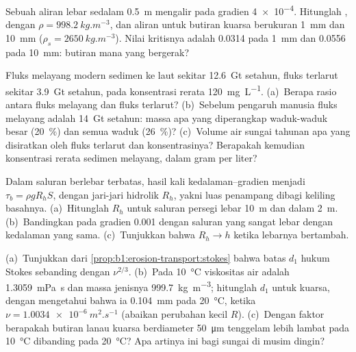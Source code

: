 \begin{exercise}[$\star$]\label{exo:b1:erosion-transport:3}
Sebuah aliran lebar sedalam \qty{0.5}{m} mengalir pada gradien \num{4e-4}. Hitunglah , dengan $\rho = \qty{998.2}{kg.m^{-3}}$, dan  aliran untuk butiran kuarsa berukuran \qty{1}{mm} dan \qty{10}{mm} ($\rho_s = \qty{2650}{kg.m^{-3}}$). Nilai kritisnya adalah \num{0.0314} pada \qty{1}{mm} dan \num{0.0556} pada \qty{10}{mm}: butiran mana yang bergerak?
\end{exercise}

\begin{exercise}[$\star$]\label{exo:b1:erosion-transport:4}
Fluks melayang modern sedimen ke laut sekitar \qty{12.6}{Gt} setahun, fluks terlarut sekitar \qty{3.9}{Gt} setahun, pada konsentrasi rerata \qty{120}{mg.L^{-1}}. (a)~Berapa rasio antara fluks melayang dan fluks terlarut? (b)~Sebelum pengaruh manusia fluks melayang adalah \qty{14}{Gt} setahun: massa apa yang diperangkap waduk-waduk besar (\qty{20}{\percent}) dan semua waduk (\qty{26}{\percent})? (c)~Volume air sungai tahunan apa yang disiratkan oleh fluks terlarut dan konsentrasinya? Berapakah kemudian konsentrasi rerata sedimen melayang, dalam gram per liter?
\end{exercise}

\begin{exercise}[$\star\star$]\label{exo:b1:erosion-transport:5}
Dalam saluran berlebar terbatas, hasil kali kedalaman--gradien menjadi $\tau_b =
\rho g R_h S$, dengan jari-jari hidrolik $R_h$, yakni luas penampang dibagi keliling basahnya. (a)~Hitunglah $R_h$ untuk saluran persegi lebar \qty{10}{m} dan dalam \qty{2}{m}. (b)~Bandingkan  pada gradien \num{0.001} dengan  saluran yang sangat lebar dengan kedalaman yang sama. (c)~Tunjukkan bahwa $R_h \to h$ ketika lebarnya bertambah.
\end{exercise}

\begin{exercise}[$\star\star$]\label{exo:b1:erosion-transport:6}
(a)~Tunjukkan dari \cref{prop:b1:erosion-transport:stokes} bahwa batas $d_1$ hukum Stokes
sebanding dengan $\nu^{2/3}$. (b)~Pada \qty{10}{\celsius} viskositas air adalah \qty{1.3059}{mPa.s} dan massa jenisnya
\qty{999.7}{kg.m^{-3}}; hitunglah $d_1$ untuk kuarsa, dengan mengetahui bahwa ia
\qty{0.104}{mm} pada \qty{20}{\celsius}, ketika $\nu = \qty{1.0034e-6}{m^2.s^{-1}}$
(abaikan perubahan kecil $R$). (c)~Dengan faktor berapakah butiran lanau kuarsa
berdiameter \qty{50}{\micro m} tenggelam lebih lambat pada \qty{10}{\celsius} dibanding pada \qty{20}{\celsius}? Apa artinya ini bagi sungai di musim dingin?
\end{exercise}

